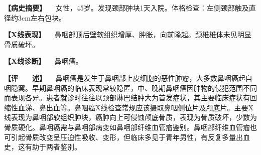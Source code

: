 \textbf{【病史摘要】}
　女性，45岁。发现颈部肿块1天入院。体格检查：左侧颈部触及直径约3cm左右包块。

\textbf{【X线表现】}
　鼻咽部顶后壁软组织增厚、肿胀，向前隆起。颈椎椎体未见明显骨质破坏。

\textbf{【X线诊断】} 　鼻咽癌。

\textbf{【评　　述】}
　鼻咽癌是发生于鼻咽部上皮细胞的恶性肿瘤，大多数鼻咽癌起自咽隐窝。早期鼻咽癌的临床表现常较隐匿，中、晚期鼻咽癌因肿物的侵犯范围不同而表现各异。患者就诊时往往以颈部淋巴结肿大为首发症状，其主要临床症状有回缩性血涕、鼻出血等。鼻咽癌X线检查常规应该摄取鼻咽侧位片及颅底片。主要X线表现为鼻咽部软组织肿块，癌肿向上可侵蚀颅底骨质，表现为骨质破坏，少数为骨质硬化。鼻咽癌需与鼻咽部病变如鼻咽部纤维血管瘤鉴别。鼻咽部纤维血管瘤也可引起骨质改变呈压迫性吸收、变形，但临床多见于青年男性，有反复多量出血史，这有助于两者鉴别。

